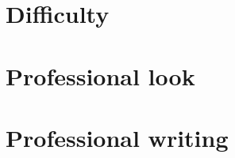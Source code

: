\documentclass[11pt]{article}
\begin{document}
\section*{Difficulty}

\vspace*{0.3in}


\section*{Professional look}

\vspace*{0.3in}

\section*{Professional writing}

\vspace*{0.3in}




\end{document}
